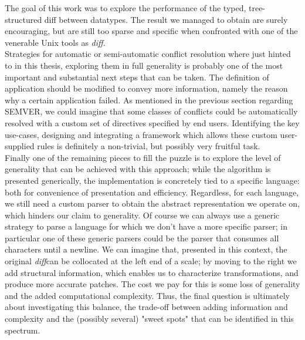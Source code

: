 \documentclass[11pt, titlepage]{article}
\newcommand{\diff}{\emph{diff}}
\begin{document}
The goal of this work was to explore the performance of the typed, tree-structured diff between datatypes. The result we managed to obtain are surely encouraging, but are still too sparse and specific when confronted with one of the venerable Unix tools as \diff.
\\
Strategies for automatic or semi-automatic conflict resolution where just hinted to in this thesis, exploring them in full generality is probably one of the most important and substantial next steps that can be taken. The definition of application should be modified to convey more information, namely the reason why a certain application failed. 
As mentioned in the previous section regarding SEMVER, we could imagine that some classes of conflicts could be automatically resolved with a custom set of directives specified by end users. Identifying the key use-cases, designing and integrating a framework which allows these custom user-supplied rules is definitely a non-trivial, but possibly very fruitful task.
\\
Finally one of the remaining pieces to fill the puzzle is to explore the level of generality that can be achieved with this approach; while the algorithm is presented generically, the implementation is concretely tied to a specific language: both for convenience of presentation and efficiency. Regardless, for each language, we still need a custom parser to obtain the abstract representation we operate on, which hinders our claim to generality. Of course we can always use a generic strategy to parse a language for which we don't have a more specific parser; in particular one of these generic parsers could be the parser that consumes all characters until a newline. We can imagine that, presented in this context, the original \diff can be collocated at the left end of a scale; by moving to the right we add structural information, which enables us to characterize transformations, and produce more accurate patches. The cost we pay for this is some loss of generality and the added computational complexity. Thus, the final question is ultimately about investigating this balance, the trade-off between adding information and complexity and the (possibly several) "sweet spots" that can be identified in this spectrum.

%
\end{document}

